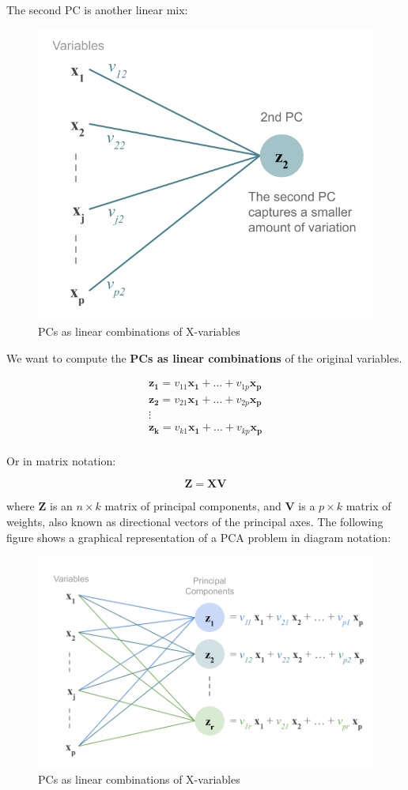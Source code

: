 \documentclass[]{book}
\begin{document}
The second PC is another linear mix:

\begin{figure}

{\centering \includegraphics[width=0.5\linewidth]{images/pca/pca-path-diag2} 

}

\caption{PCs as linear combinations of X-variables}\label{fig:unnamed-chunk-28}
\end{figure}

We want to compute the \textbf{PCs as linear combinations} of the original variables.

\[ 
\begin{array}{c}
\mathbf{z_1} = v_{11} \mathbf{x_1} + \dots + v_{1p} \mathbf{x_p} \\
\mathbf{z_2} = v_{21} \mathbf{x_1} + \dots + v_{2p} \mathbf{x_p} \\
\vdots \\
\mathbf{z_k} = v_{k1} \mathbf{x_1} + \dots + v_{kp} \mathbf{x_p} \\
\end{array}
\]

Or in matrix notation:

\[
\mathbf{Z} = \mathbf{X V}
\]

where \(\mathbf{Z}\) is an \(n \times k\) matrix of principal components, and
\(\mathbf{V}\) is a \(p \times k\) matrix of weights, also known as directional
vectors of the principal axes. The following figure shows a graphical
representation of a PCA problem in diagram notation:

\begin{figure}

{\centering \includegraphics[width=0.7\linewidth]{images/pca/pca-path-diag4} 

}

\caption{PCs as linear combinations of X-variables}\label{fig:unnamed-chunk-29}
\end{figure}
\end{document}
